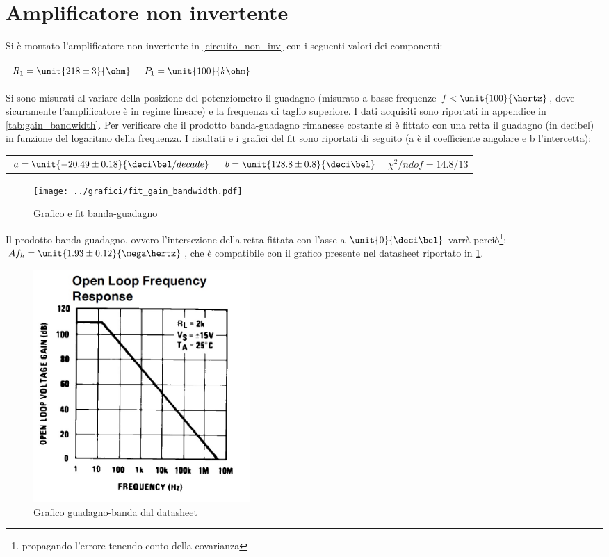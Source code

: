 \documentclass[10pt,a4paper]{article}
\begin{document}
\section{Amplificatore non invertente}

Si è montato l'amplificatore non invertente in \figurename{\ref{circuito_non_inv}} con i seguenti valori dei componenti:

\begin{table}[h!]
	\centering
	\begin{tabular}{cc}
		$R_1 = \unit{218 \pm 3}{\ohm}$  & $P_1 = \unit{100}{k\ohm}$
	\end{tabular}
\end{table}

Si sono misurati al variare della posizione del potenziometro il guadagno (misurato a basse frequenze $f < \unit{100}{\hertz}$, dove sicuramente l'amplificatore è in regime lineare) e la frequenza di taglio superiore. I dati acquisiti sono riportati in appendice in \tablename{\ref{tab:gain_bandwidth}}. Per verificare che il prodotto banda-guadagno rimanesse costante si è fittato con una retta il guadagno (in decibel) in funzione del logaritmo della frequenza. I risultati e i grafici del fit sono riportati di seguito (a è il coefficiente angolare e b l'intercetta):

\begin{table}[h!]
	\centering
	\begin{tabular}{ccc}
		$a = \unit{-20.49 \pm 0.18}{\deci\bel /decade}$  &  $b = \unit{128.8 \pm 0.8}{\deci\bel}$ & $\chi^2/ndof= 14.8 / 13$
	\end{tabular}
\end{table}

\begin{figure}[h!]
	\centering
	\texttt{[image: ../grafici/fit\_gain\_bandwidth.pdf]}
	\caption{Grafico e fit banda-guadagno}
\end{figure}

Il prodotto banda guadagno, ovvero l'intersezione della retta fittata con l'asse a $\unit{0}{\deci\bel}$ varrà perciò\footnote{propagando l'errore tenendo conto della covarianza}: $Af_h=\unit{1.93\pm0.12}{\mega\hertz}$, che è compatibile con il grafico presente nel datasheet riportato in \figurename{\ref{fig:open_loop_stocazzo}}.

\begin{figure}[h!]
	\centering
	\includegraphics[width=0.4\textwidth]{../grafici/open_loop_frequency.jpg}
	\caption{Grafico guadagno-banda dal datasheet}
	\label{fig:open_loop_stocazzo}
\end{figure}
\end{document}
